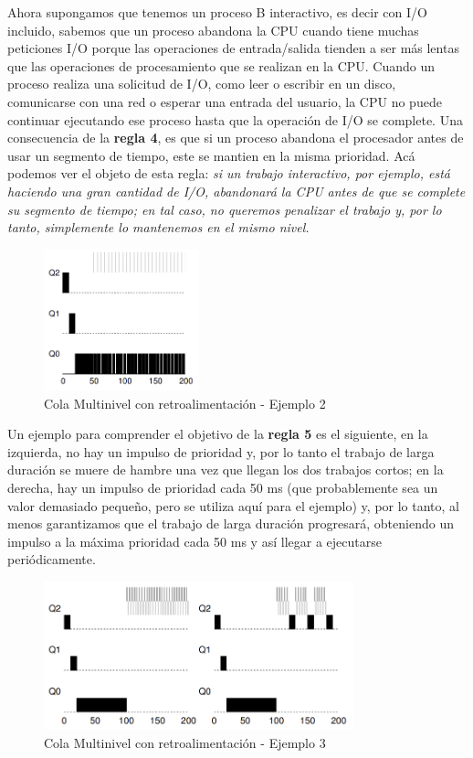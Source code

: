 \documentclass{article}
\begin{document}
Ahora supongamos que tenemos un proceso B interactivo, es decir con I/O incluido, sabemos que un proceso abandona la CPU cuando tiene muchas peticiones I/O porque las operaciones de entrada/salida tienden a ser más lentas que las operaciones de procesamiento que se realizan en la CPU. Cuando un proceso realiza una solicitud de I/O, como leer o escribir en un disco, comunicarse con una red o esperar una entrada del usuario, la CPU no puede continuar ejecutando ese proceso hasta que la operación de I/O se complete. Una consecuencia de la \textbf{regla 4}, es que si un proceso abandona el procesador antes de usar un segmento de tiempo, este se mantien en la misma prioridad. Acá podemos ver el objeto de esta regla: \textit{si un trabajo interactivo, por ejemplo, está haciendo una gran cantidad de I/O, abandonará la CPU antes de que se complete su segmento de tiempo; en tal caso, no queremos penalizar el trabajo y, por lo tanto, simplemente lo mantenemos en el mismo nivel.}

\begin{figure}[h]
    \centering
    \includegraphics[width=0.4\textwidth]{src/mlfq2.png}
    \caption{Cola Multinivel con retroalimentación - Ejemplo 2}
\end{figure}
\newpage
Un ejemplo para comprender el objetivo de la \textbf{regla 5} es el siguiente, en la izquierda, no hay un impulso de prioridad y, por lo tanto el trabajo de larga duración se muere de hambre una vez que llegan los dos trabajos cortos; en la derecha, hay un impulso de prioridad cada 50 ms (que probablemente sea un valor demasiado pequeño, pero se utiliza aquí para el ejemplo) y, por lo tanto, al menos garantizamos que el trabajo de larga duración progresará, obteniendo un impulso a la máxima prioridad cada 50 ms y así llegar a ejecutarse periódicamente.

\begin{figure}[h]
    \centering
    \includegraphics[width=0.8\textwidth]{src/mlfq3.png}
    \caption{Cola Multinivel con retroalimentación - Ejemplo 3}
\end{figure}
\end{document}

